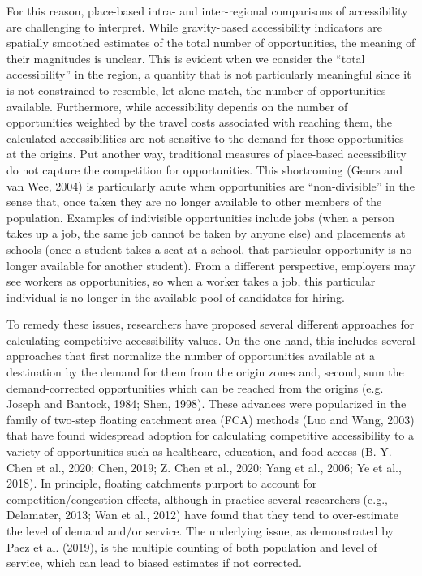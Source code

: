 \documentclass[]{elsarticle} %
\begin{document}
For this reason, place-based intra- and inter-regional comparisons of
accessibility are challenging to interpret. While gravity-based
accessibility indicators are spatially smoothed estimates of the total
number of opportunities, the meaning of their magnitudes is unclear.
This is evident when we consider the ``total accessibility'' in the
region, a quantity that is not particularly meaningful since it is not
constrained to resemble, let alone match, the number of opportunities
available. Furthermore, while accessibility depends on the number of
opportunities weighted by the travel costs associated with reaching
them, the calculated accessibilities are not sensitive to the demand for
those opportunities at the origins. Put another way, traditional
measures of place-based accessibility do not capture the competition for
opportunities. This shortcoming (Geurs and van Wee, 2004) is
particularly acute when opportunities are ``non-divisible'' in the sense
that, once taken they are no longer available to other members of the
population. Examples of indivisible opportunities include jobs (when a
person takes up a job, the same job cannot be taken by anyone else) and
placements at schools (once a student takes a seat at a school, that
particular opportunity is no longer available for another student). From
a different perspective, employers may see workers as opportunities, so
when a worker takes a job, this particular individual is no longer in
the available pool of candidates for hiring.

To remedy these issues, researchers have proposed several different
approaches for calculating competitive accessibility values. On the one
hand, this includes several approaches that first normalize the number
of opportunities available at a destination by the demand for them from
the origin zones and, second, sum the demand-corrected opportunities
which can be reached from the origins (e.g. Joseph and Bantock, 1984;
Shen, 1998). These advances were popularized in the family of two-step
floating catchment area (FCA) methods (Luo and Wang, 2003) that have
found widespread adoption for calculating competitive accessibility to a
variety of opportunities such as healthcare, education, and food access
(B. Y. Chen et al., 2020; Chen, 2019; Z. Chen et al., 2020; Yang et al.,
2006; Ye et al., 2018). In principle, floating catchments purport to
account for competition/congestion effects, although in practice several
researchers (e.g., Delamater, 2013; Wan et al., 2012) have found that
they tend to over-estimate the level of demand and/or service. The
underlying issue, as demonstrated by Paez et al. (2019), is the multiple
counting of both population and level of service, which can lead to
biased estimates if not corrected.
\end{document}
